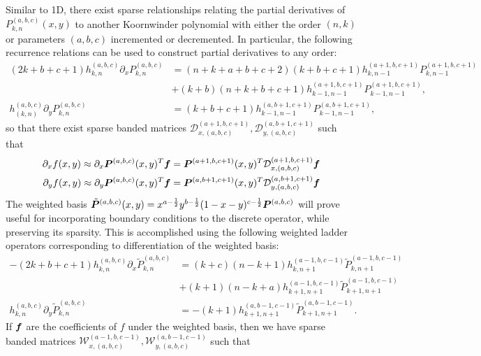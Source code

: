Similar to 1D, there exist sparse relationships relating the partial derivatives of $P_{k,n}^{(a,b,c)}(x,y)$ to another Koornwinder polynomial with either the order $(n,k)$ or parameters $(a,b,c)$ incremented or decremented. In particular, the following recurrence relations can be used to construct partial derivatives to any order:
\begin{align}
(2k+b+c+1)h_{k,n}^{(a,b,c)}\partial_x P_{k,n}^{(a,b,c)} &= (n+k+a+b+c+2)(k+b+c+1)h_{k,n-1}^{(a+1,b,c+1)}P_{k,n-1}^{(a+1,b,c+1)} \nonumber \\
&+(k+b)(n+k+b+c+1)h_{k-1,n-1}^{(a+1,b,c+1)}P_{k-1,n-1}^{(a+1,b,c+1)},\label{eq:ladpartx}\\
h_{(k,n)}^{(a,b,c)}\partial_y P_{k,n}^{(a,b,c)} &= (k+b+c+1)h_{k-1,n-1}^{(a,b+1,c+1)}P_{k-1,n-1}^{(a,b+1,c+1)},\label{eq:ladparty}
\end{align}
so that there exist sparse banded matrices $\mathcal{D}_{x,(a,b,c)}^{(a+1,b,c+1)},\mathcal{D}_{y,(a,b,c)}^{(a,b+1,c+1)}$ such that
\begin{align}
	\partial_x f(x,y) \approx \partial_x \boldsymbol{P}^{(a,b,c)}(x,y)^T \boldsymbol{f} &= \boldsymbol{P}^{(a+1,b,c+1)}(x,y)^T\mathcal{D}_{x,(a,b,c)}^{(a+1,b,c+1)}\boldsymbol{f}\\
	\partial_y f(x,y) \approx \partial_y \boldsymbol{P}^{(a,b,c)}(x,y)^T \boldsymbol{f} &= \boldsymbol{P}^{(a,b+1,c+1)}(x,y)^T\mathcal{D}_{y,(a,b,c)}^{(a,b+1,c+1)}\boldsymbol{f}	
\end{align}
The weighted basis $\tilde{\boldsymbol{P}}^{(a,b,c)}(x,y) = x^{a-\frac{1}{2}}y^{b-\frac{1}{2}}(1-x-y)^{c-\frac{1}{2}}\boldsymbol{P}^{(a,b,c)}$ will prove useful for incorporating boundary conditions to the discrete operator, while preserving its sparsity. This is accomplished using the following weighted ladder operators corresponding to differentiation of the weighted basis:
\begin{align}
	-(2k+b+c+1)h_{k,n}^{(a,b,c)}\partial_x\tilde{P}_{k,n}^{(a,b,c)} &=  (k+c)(n-k+1)h_{k,n+1}^{(a-1,b,c-1)}\tilde{P}_{k,n+1}^{(a-1,b,c-1)} \nonumber \\&+ (k+1)(n-k+a)h_{k+1,n+1}^{(a-1,b,c-1)}\tilde{P}_{k+1,n+1}^{(a-1,b,c-1)}\\
	h_{k,n}^{(a,b,c)}\partial_y\tilde{P}_{k,n}^{(a,b,c)} &= -(k+1)h_{k+1,n+1}^{(a,b-1,c-1)}\tilde{P}_{k+1,n+1}^{(a,b-1,c-1)}.
\end{align}
If $\boldsymbol{f}$ are the coefficients of $f$ under the weighted basis, then we have sparse banded matrices $\mathcal{W}_{x,(a,b,c)}^{(a-1,b,c-1)},\mathcal{W}_{y,(a,b,c)}^{(a,b-1,c-1)}$ such that
